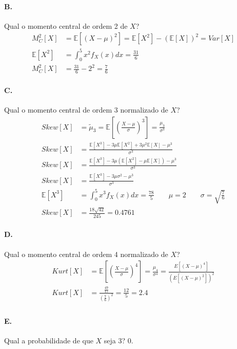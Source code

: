 \documentclass{article}
\begin{document}
\paragraph*{B.} Qual o momento central de ordem 2 de $X$?
\begin{align*}
    M_C^2[X] &= \mathbb{E}[(X - \mu)^2] = \mathbb{E}[X^2] - (\mathbb{E}[X])^2 = Var[X] \\
    \mathbb{E}[X^2] &= \int_0^5 x^2 f_X(x) dx = \frac{31}{6} \\
    M_C^2[X] &= \frac{31}{6} - 2^2 = \frac{7}{6}
\end{align*}

\paragraph*{C.} Qual o momento central de ordem 3 normalizado de $X$?
\begin{align*}
    Skew[X] &= \widetilde{\mu}_3 = \mathbb{E}\left[ \left( \frac{X - \mu}{\sigma} \right)^3
    \right] = \frac{\mu_3}{\sigma^3} \\
    Skew[X] &= \frac{\mathbb{E}[X^3] -3\mu\mathbb{E}[X^2] +3\mu^2\mathbb{E}[X] -
    \mu^3}{\sigma^3} \\
    Skew[X] &= \frac{\mathbb{E}[X^3] -3\mu(\mathbb{E}[X^2] -\mu\mathbb{E}[X])-\mu^3}{\sigma^3} \\
    Skew[X] &= \frac{\mathbb{E}[X^3] -3\mu\sigma^2 -\mu^3}{\sigma^3} \\
    \mathbb{E}[X^3] &= \int_0^5 x^3 f_X(x) dx = \frac{78}{5} \qquad \mu = 2 \qquad \sigma =
    \sqrt{\frac{7}{6}} \\
    Skew[X] &= \frac{18\sqrt{42}}{245} = 0.4761
\end{align*}

\paragraph*{D.} Qual o momento central de ordem 4 normalizado de $X$?
\begin{align*}
    Kurt[X] &= \mathbb{E}\left[ \left( \frac{X - \mu}{\sigma} \right)^4
    \right] = \frac{\mu_4}{\sigma^4} = \frac{E[(X-\mu)^4]}{(E[(X-\mu)^2])^2} \\
        Kurt[X] &= \frac{\frac{49}{15}}{(\frac{7}{6})^2} = \frac{12}{5} = 2.4 \\
\end{align*}

\paragraph*{E.} Qual a probabilidade de que $X$ seja 3?
0.
\end{document}
